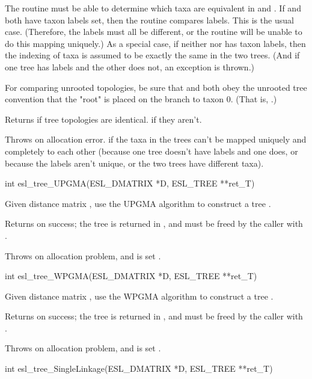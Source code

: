 \begin{sreapi}
The routine must be able to determine which taxa are
equivalent in  and . If  and  both have
taxon labels set, then the routine compares labels.
This is the usual case. (Therefore, the  labels must
all be different, or the routine will be unable to do
this mapping uniquely.) As a special case, if neither
 nor  has taxon labels, then the indexing of
taxa  is assumed to be exactly the same in the
two trees. (And if one tree has labels and the other
does not, an  exception is thrown.)

For comparing unrooted topologies, be sure that  and
 both obey the unrooted tree convention that the
"root" is placed on the branch to taxon 0. (That is,
.)

Returns  if tree topologies are identical. 
if they aren't.           

Throws  on allocation error.  if the taxa in
the trees can't be mapped uniquely and completely to
each other (because one tree doesn't have labels and
one does, or because the labels aren't unique, or the
two trees have different taxa).


\hypertarget{func:esl_tree_UPGMA()}
{\item[int esl\_tree\_UPGMA(ESL\_DMATRIX *D, ESL\_TREE **ret\_T)]}

Given distance matrix , use the UPGMA algorithm
to construct a tree .

Returns  on success; the tree is returned in ,
and must be freed by the caller with .

Throws  on allocation problem, and  is set .


\hypertarget{func:esl_tree_WPGMA()}
{\item[int esl\_tree\_WPGMA(ESL\_DMATRIX *D, ESL\_TREE **ret\_T)]}

Given distance matrix , use the WPGMA algorithm
to construct a tree .

Returns  on success; the tree is returned in ,
and must be freed by the caller with .

Throws  on allocation problem, and  is set .


\hypertarget{func:esl_tree_SingleLinkage()}
{\item[int esl\_tree\_SingleLinkage(ESL\_DMATRIX *D, ESL\_TREE **ret\_T)]}


\end{sreapi}
